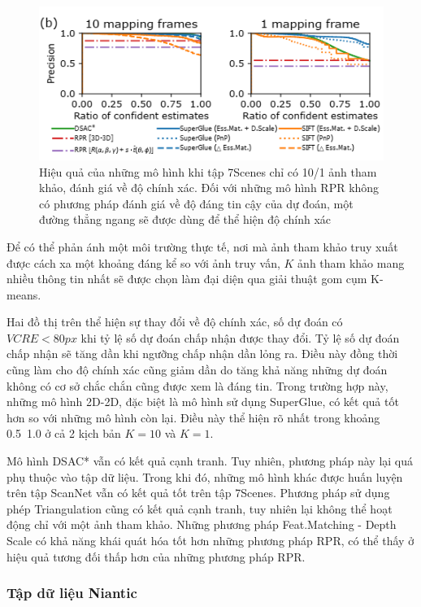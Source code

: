 \begin{figure}[H]
  \centering
  \includegraphics[width=\textwidth]{pics/Proposal/partial_7scene.png}
  \caption[Hiệu quả của các mô hình khi giới hạn ảnh tham khảo]{Hiệu quả của những mô hình khi tập 7Scenes chỉ có 10/1 ảnh tham khảo, đánh giá về độ chính xác. Đối với những mô hình RPR không có phương pháp đánh giá về độ đáng tin cậy của dự đoán, một đường thẳng ngang sẽ được dùng để thể hiện độ chính xác}
\end{figure}

Để có thể phản ánh một môi trường thực tế, nơi mà ảnh tham khảo truy xuất được cách xa một khoảng đáng kể so với ảnh truy vấn, $K$ ảnh tham khảo mang nhiều thông tin nhất sẽ được chọn làm đại diện qua giải thuật gom cụm K-means.

Hai đồ thị trên thể hiện sự thay đổi về độ chính xác, số dự đoán có $VCRE<80px$ khi tỷ lệ số dự đoán chấp nhận được thay đổi. Tỷ lệ số dự đoán chấp nhận sẽ tăng dần khi ngưỡng chấp nhận dần lỏng ra. Điều này đồng thời cũng làm cho độ chính xác cũng giảm dần do tăng khả năng những dự đoán không có cơ sở chắc chắn cũng được xem là đáng tin. Trong trường hợp này, những mô hình 2D-2D, đặc biệt là mô hình sử dụng SuperGlue, có kết quả tốt hơn so với những mô hình còn lại. Điều này thể hiện rõ nhất trong khoảng 0.5~1.0 ở cả 2 kịch bản $K=10$ và $K=1$. 

Mô hình DSAC* vẫn có kết quả cạnh tranh. Tuy nhiên, phương pháp này lại quá phụ thuộc vào tập dữ liệu. Trong khi đó, những mô hình khác được huấn luyện trên tập ScanNet vẫn có kết quả tốt trên tập 7Scenes. Phương pháp sử dụng phép Triangulation cũng có kết quả cạnh tranh, tuy nhiên lại không thể hoạt động chỉ với một ảnh tham khảo. Những phương pháp Feat.Matching - Depth Scale có khả năng khái quát hóa tốt hơn những phương pháp RPR, có thể thấy ở hiệu quả tương đối thấp hơn của những phương pháp RPR.

\subsubsection{Tập dữ liệu Niantic}

